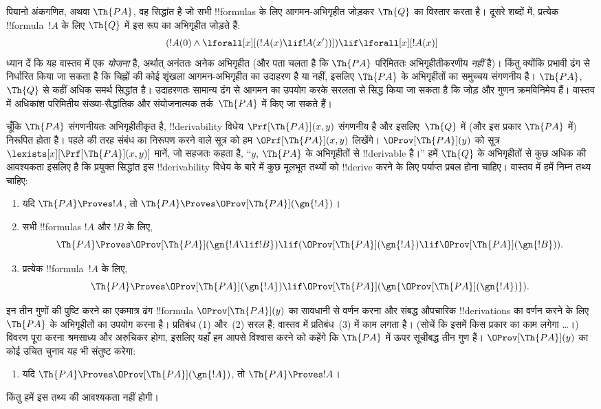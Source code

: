 \documentclass[../../../include/open-logic-section]{subfiles}
\begin{document}


पियानो अंकगणित, अथवा $\Th{PA}$, वह सिद्धांत है जो सभी !!{formula}s के लिए
आगमन-अभिगृहीत जोड़कर $\Th{Q}$ का विस्तार करता है। दूसरे शब्दों में,
प्रत्येक !!{formula}~$!A$ के लिए $\Th{Q}$ में इस रूप का अभिगृहीत जोड़ते हैं:
\[
(!A(0) \land \lforall[x][(!A(x) \lif !A(x'))]) \lif \lforall[x][!A(x)]
\]
ध्यान दें कि यह वास्तव में एक \emph{योजना} है, अर्थात् अनंततः अनेक
अभिगृहीत (और पता चलता है कि $\Th{PA}$ परिमिततः अभिगृहीतीकरणीय {\em नहीं}
है)। किंतु क्योंकि प्रभावी ढंग से निर्धारित किया जा सकता है कि चिह्नों की
कोई शृंखला आगमन-अभिगृहीत का उदाहरण है या नहीं, इसलिए $\Th{PA}$ के
अभिगृहीतों का समुच्चय संगणनीय है। $\Th{PA}$,~$\Th{Q}$ से कहीं अधिक समर्थ
सिद्धांत है। उदाहरणतः सामान्य ढंग से आगमन का उपयोग करके सरलता से सिद्ध
किया जा सकता है कि जोड़ और गुणन क्रमविनिमेय हैं। वास्तव में अधिकांश
परिमितीय संख्या-सैद्धांतिक और संयोजनात्मक तर्क~$\Th{PA}$ में किए जा सकते
हैं।

चूँकि $\Th{PA}$ संगणनीयतः अभिगृहीतीकृत है, !!{derivability} विधेय
$\Prf[\Th{PA}](x,y)$ संगणनीय है और इसलिए~$\Th{Q}$ में (और इस प्रकार
$\Th{PA}$ में) निरूपित होता है। पहले की तरह संबंध का निरूपण करने वाले
सूत्र को हम $\OPrf[\Th{PA}](x,y)$ लिखेंगे। $\OProv[\Th{PA}](y)$ को सूत्र
$\lexists[x][\Prf[\Th{PA}](x,y)]$ मानें, जो सहजतः कहता है, ``$y$,
$\Th{PA}$ के अभिगृहीतों से !!{derivable} है।'' हमें $\Th{Q}$ के अभिगृहीतों
से कुछ अधिक की आवश्यकता इसलिए है कि प्रयुक्त सिद्धांत इस
!!{derivability} विधेय के बारे में कुछ मूलभूत तथ्यों को !!{derive} करने के
लिए पर्याप्त प्रबल होना चाहिए। वास्तव में हमें निम्न तथ्य चाहिए:
\begin{enumerate}
\item[P1.] यदि $\Th{PA} \Proves !A$, तो
  $\Th{PA} \Proves \OProv[\Th{PA}](\gn{!A})$।
\item[P2.] सभी !!{formula}s $!A$ और $!B$ के लिए,
  \[
  \Th{PA} \Proves \OProv[\Th{PA}](\gn{!A \lif !B}) \lif
  (\OProv[\Th{PA}](\gn{!A}) \lif \OProv[\Th{PA}](\gn{!B})).
  \]
\item[P3.] प्रत्येक !!{formula}~$!A$ के लिए,
  \[
  \Th{PA} \Proves \OProv[\Th{PA}](\gn{!A})
  \lif \OProv[\Th{PA}](\gn{\OProv[\Th{PA}](\gn{!A})}).
  \]
\end{enumerate}
इन तीन गुणों की पुष्टि करने का एकमात्र ढंग !!{formula}
$\OProv[\Th{PA}](y)$ का सावधानी से वर्णन करना और संबद्ध औपचारिक
!!{derivation}s का वर्णन करने के लिए $\Th{PA}$ के अभिगृहीतों का उपयोग करना
है। प्रतिबंध (1) और~(2) सरल हैं; वास्तव में प्रतिबंध~(3) में काम लगता है।
(सोचें कि इसमें किस प्रकार का काम लगेगा \dots।) विवरण पूरा करना श्रमसाध्य
और अरुचिकर होगा, इसलिए यहाँ हम आपसे विश्वास करने को कहेंगे कि $\Th{PA}$
में ऊपर सूचीबद्ध तीन गुण हैं। $\OProv[\Th{PA}](y)$ का कोई उचित चुनाव यह भी
संतुष्ट करेगा:
\begin{enumerate}
\item[P4.] यदि $\Th{PA} \Proves \OProv[\Th{PA}](\gn{!A})$, तो
  $\Th{PA} \Proves !A$।
\end{enumerate}
किंतु हमें इस तथ्य की आवश्यकता नहीं होगी।
\end{document}
